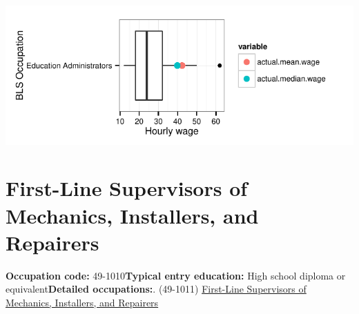 \documentclass[a4paper,10pt]{article}\usepackage[]{graphicx}\usepackage[]{color}
\makeatletter
\def\maxwidth{ %
  \ifdim\Gin@nat@width>\linewidth
    \linewidth
  \else
    \Gin@nat@width
  \fi
}
\makeatother
\begin{document}
{\centering \includegraphics[width=\maxwidth]{figure/unnamed-chunk-279} 

}


\newpage\section{First-Line Supervisors of Mechanics, Installers, and Repairers}\textbf{Occupation code:} 49-1010\newline\textbf{Typical entry education:} High school diploma or equivalent\newline\textbf{Detailed occupations:}. (49-1011)  \href{http://www.bls.gov/oes/current/oes491011.htm}{First-Line Supervisors of Mechanics, Installers, and Repairers}\newline%
\end{document}
